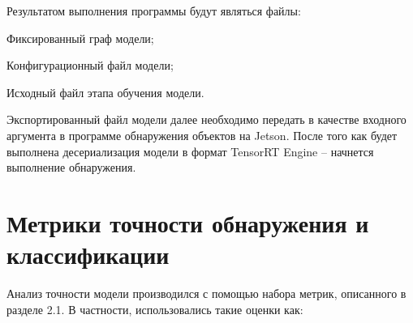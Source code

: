 
Результатом выполнения программы будут являться файлы:

%
\begin{itemize*}
  \item Фиксированный граф модели;
  \item Конфигурационный файл модели;
  \item Исходный файл этапа обучения модели.
\end{itemize*}
%

Экспортированный файл модели далее необходимо передать в качестве входного аргумента в программе обнаружения объектов на Jetson. После того как будет выполнена десериализация модели в формат TensorRT Engine – начнется выполнение обнаружения. 

\section{Метрики точности обнаружения и классификации}

Анализ точности модели производился с помощью набора метрик, описанного в разделе 2.1. В частности, использовались такие оценки как:

